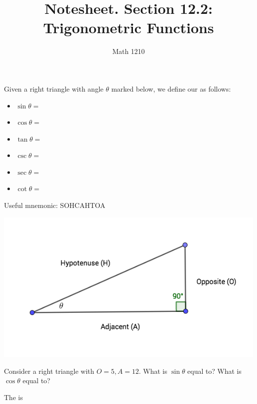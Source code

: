 \documentclass[12pt, a4paper]{article}
\author{Math 1210}
\title{Notesheet. Section 12.2: Trigonometric Functions}
\date{}
\begin{document}
\maketitle
\nameline
\begin{defi}
  Given a right triangle with angle \(\theta\) marked below, we define
  our  as follows:\\
  \begin{minipage}{0.5\linewidth}
    \begin{itemize}
    \item \(\sin \theta =\)
    \item \(\cos \theta =\)
    \item \(\tan \theta =\)
    \item \(\csc \theta =\)
    \item \(\sec \theta =\)
    \item \(\cot \theta =\)
    \end{itemize}
    Useful mnemonic: SOHCAHTOA
  \end{minipage}
  \begin{minipage}{0.5\linewidth}
  \includegraphics[scale=0.5]{images/right-triangle}    
  \end{minipage}
\end{defi}
\vspace{-0.3in}
\begin{ex}
  Consider a right triangle with \(O = 5, A = 12\). What is \(\sin
  \theta\) equal to? What is \(\cos \theta\) equal to?
\end{ex}
\vspace{-0.5in}
\begin{defi}
  The  is
\end{defi}
\vspace{-1in}
\end{document}
